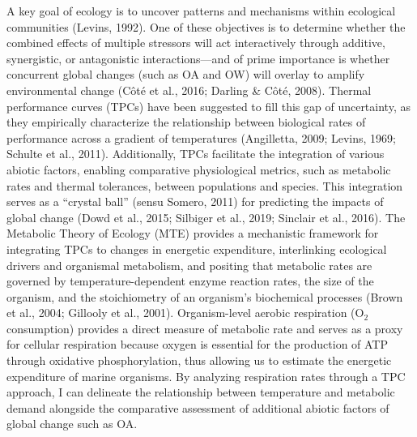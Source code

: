 \documentclass{CSUNthesis}
\begin{document}
A key goal of ecology is to uncover patterns and mechanisms within ecological communities (Levins, 1992). One of these objectives is to determine whether the combined effects of multiple stressors will act interactively through additive, synergistic, or antagonistic interactions---and of prime importance is whether concurrent global changes (such as OA and OW) will overlay to amplify environmental change (Côté et al., 2016; Darling \& Côté, 2008). Thermal performance curves (TPCs) have been suggested to fill this gap of uncertainty, as they empirically characterize the relationship between biological rates of performance across a gradient of temperatures (Angilletta, 2009; Levins, 1969; Schulte et al., 2011). Additionally, TPCs facilitate the integration of various abiotic factors, enabling comparative physiological metrics, such as metabolic rates and thermal tolerances, between populations and species. This integration serves as a ``crystal ball'' (sensu Somero, 2011) for predicting the impacts of global change (Dowd et al., 2015; Silbiger et al., 2019; Sinclair et al., 2016). The Metabolic Theory of Ecology (MTE) provides a mechanistic framework for integrating TPCs to changes in energetic expenditure, interlinking ecological drivers and organismal metabolism, and positing that metabolic rates are governed by temperature-dependent enzyme reaction rates, the size of the organism, and the stoichiometry of an organism's biochemical processes (Brown et al., 2004; Gillooly et al., 2001). Organism-level aerobic respiration (O\(_2\) consumption) provides a direct measure of metabolic rate and serves as a proxy for cellular respiration because oxygen is essential for the production of ATP through oxidative phosphorylation, thus allowing us to estimate the energetic expenditure of marine organisms. By analyzing respiration rates through a TPC approach, I can delineate the relationship between temperature and metabolic demand alongside the comparative assessment of additional abiotic factors of global change such as OA.
\end{document}

